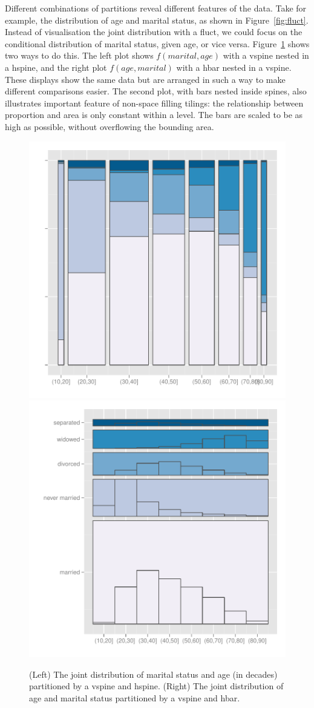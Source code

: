 \documentclass[journal]{vgtc}
\begin{document}

Different combinations of partitions reveal different features of the data. Take for example, the distribution of age and marital status, as shown in Figure~\ref{fig:fluct}. Instead of visualisation the joint distribution with a fluct, we could focus on the conditional distribution of marital status, given age, or vice versa. Figure~\ref{fig:marital} shows two ways to do this. The left plot shows $f(marital, age)$ with a vspine nested in a hspine, and the right plot $f(age, marital)$ with a hbar nested in a vspine. These displays show the same data but are arranged in such a way to make different comparisons easier. The second plot, with bars nested inside spines, also illustrates important feature of non-space filling tilings: the relationship between proportion and area is only constant within a level. The bars are scaled to be as high as possible, without overflowing the bounding area.

\begin{figure}[htbp]
  \centering
    \includegraphics[width=0.5\linewidth]{part-marital-1}%
    \includegraphics[width=0.5\linewidth]{part-marital-2}
  \caption{(Left) The joint distribution of marital status and age (in decades) partitioned by a vspine and hspine.  (Right) The joint distribution of age and marital status partitioned by a vspine and hbar.}
  \label{fig:marital}
\end{figure}
\end{document}
